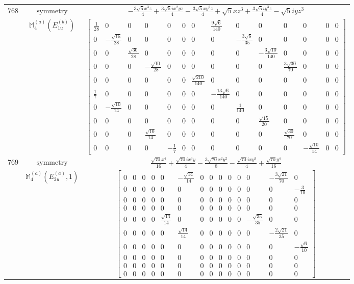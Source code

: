 \documentclass[fleqn,8pt,landscape]{jsarticle}
\begin{document}
\begin{longtable}{ccc}
$ 768 $ & $ \text{symmetry} $ & $ - \frac{3 \sqrt{5} x^{3} z}{4} + \frac{3 \sqrt{5} i x^{2} y z}{4} - \frac{3 \sqrt{5} x y^{2} z}{4} + \sqrt{5} x z^{3} + \frac{3 \sqrt{5} i y^{3} z}{4} - \sqrt{5} i y z^{3} $ \\
$  $ & $ \mathbb{M}_{4}^{(a)}(E_{1u}^{(b)}) $ & $ \begin{bmatrix} \frac{1}{28} & 0 & 0 & 0 & 0 & 0 & 0 & \frac{9 \sqrt{6}}{140} & 0 & 0 & 0 & 0 & 0 & 0 \\ 0 & - \frac{\sqrt{15}}{28} & 0 & 0 & 0 & 0 & 0 & 0 & - \frac{3 \sqrt{6}}{35} & 0 & 0 & 0 & 0 & 0 \\ 0 & 0 & \frac{\sqrt{30}}{28} & 0 & 0 & 0 & 0 & 0 & 0 & - \frac{3 \sqrt{10}}{140} & 0 & 0 & 0 & 0 \\ 0 & 0 & 0 & - \frac{\sqrt{10}}{28} & 0 & 0 & 0 & 0 & 0 & 0 & \frac{3 \sqrt{30}}{70} & 0 & 0 & 0 \\ 0 & 0 & 0 & 0 & 0 & 0 & \frac{\sqrt{210}}{140} & 0 & 0 & 0 & 0 & 0 & 0 & 0 \\ \frac{1}{7} & 0 & 0 & 0 & 0 & 0 & 0 & - \frac{13 \sqrt{6}}{140} & 0 & 0 & 0 & 0 & 0 & 0 \\ 0 & - \frac{\sqrt{10}}{14} & 0 & 0 & 0 & 0 & 0 & 0 & \frac{1}{140} & 0 & 0 & 0 & 0 & 0 \\ 0 & 0 & 0 & 0 & 0 & 0 & 0 & 0 & 0 & \frac{\sqrt{15}}{20} & 0 & 0 & 0 & 0 \\ 0 & 0 & 0 & \frac{\sqrt{10}}{14} & 0 & 0 & 0 & 0 & 0 & 0 & \frac{\sqrt{30}}{70} & 0 & 0 & 0 \\ 0 & 0 & 0 & 0 & - \frac{1}{7} & 0 & 0 & 0 & 0 & 0 & 0 & - \frac{\sqrt{10}}{14} & 0 & 0 \end{bmatrix} $ \\ \hline
$ 769 $ & $ \text{symmetry} $ & $ \frac{\sqrt{70} x^{4}}{16} + \frac{\sqrt{70} i x^{3} y}{4} - \frac{3 \sqrt{70} x^{2} y^{2}}{8} - \frac{\sqrt{70} i x y^{3}}{4} + \frac{\sqrt{70} y^{4}}{16} $ \\
$  $ & $ \mathbb{M}_{4}^{(a)}(E_{2u}^{(a)},1) $ & $ \begin{bmatrix} 0 & 0 & 0 & 0 & 0 & - \frac{\sqrt{14}}{14} & 0 & 0 & 0 & 0 & 0 & 0 & - \frac{3 \sqrt{21}}{70} & 0 \\ 0 & 0 & 0 & 0 & 0 & 0 & 0 & 0 & 0 & 0 & 0 & 0 & 0 & - \frac{3}{10} \\ 0 & 0 & 0 & 0 & 0 & 0 & 0 & 0 & 0 & 0 & 0 & 0 & 0 & 0 \\ 0 & 0 & 0 & 0 & 0 & 0 & 0 & 0 & 0 & 0 & 0 & 0 & 0 & 0 \\ 0 & 0 & 0 & 0 & \frac{\sqrt{14}}{14} & 0 & 0 & 0 & 0 & 0 & 0 & - \frac{\sqrt{35}}{35} & 0 & 0 \\ 0 & 0 & 0 & 0 & 0 & \frac{\sqrt{14}}{14} & 0 & 0 & 0 & 0 & 0 & 0 & - \frac{2 \sqrt{21}}{35} & 0 \\ 0 & 0 & 0 & 0 & 0 & 0 & 0 & 0 & 0 & 0 & 0 & 0 & 0 & - \frac{\sqrt{6}}{10} \\ 0 & 0 & 0 & 0 & 0 & 0 & 0 & 0 & 0 & 0 & 0 & 0 & 0 & 0 \\ 0 & 0 & 0 & 0 & 0 & 0 & 0 & 0 & 0 & 0 & 0 & 0 & 0 & 0 \\ 0 & 0 & 0 & 0 & 0 & 0 & 0 & 0 & 0 & 0 & 0 & 0 & 0 & 0 \end{bmatrix} $ \\ \hline

\end{longtable}
\end{document}
